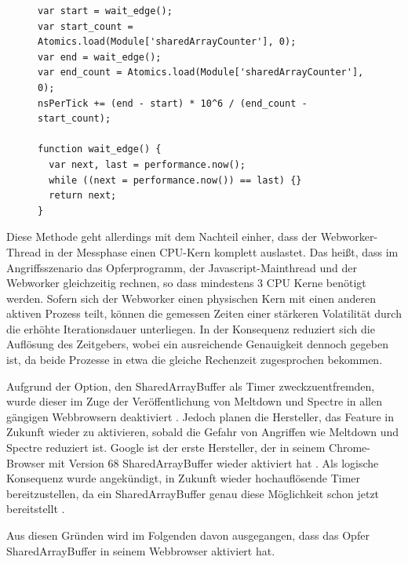 \begin{figure}[h]
\label{alg_list:getResolutionNS}
\begin{lstlisting}[caption=main.js: Code welcher die Timerauflösung bestimmt]
var start = wait_edge();
var start_count = Atomics.load(Module['sharedArrayCounter'], 0);
var end = wait_edge();
var end_count = Atomics.load(Module['sharedArrayCounter'], 0);
nsPerTick += (end - start) * 10^6 / (end_count - start_count);

function wait_edge() {
  var next, last = performance.now();
  while ((next = performance.now()) == last) {}
  return next;
}
\end{lstlisting}
\end{figure}

Diese Methode geht allerdings mit dem Nachteil einher, dass der Webworker-Thread in der Messphase einen CPU-Kern komplett auslastet. Das heißt, dass im Angriffsszenario das Opferprogramm, der Javascript-Mainthread und der Webworker gleichzeitig rechnen, so dass mindestens 3 CPU Kerne benötigt werden. 
Sofern sich der Webworker einen physischen Kern mit einen anderen aktiven Prozess teilt, können die gemessen Zeiten einer stärkeren Volatilität durch die erhöhte Iterationsdauer unterliegen.
In der Konsequenz reduziert sich die Auflösung des Zeitgebers, wobei ein ausreichende Genauigkeit dennoch gegeben ist, da beide Prozesse in etwa die gleiche Rechenzeit zugesprochen bekommen.

Aufgrund der Option, den SharedArrayBuffer als Timer zweckzuentfremden, wurde dieser im Zuge der Veröffentlichung von Meltdown und Spectre in allen gängigen Webbrowsern deaktiviert \cite{FirefoxSharedArrayBuffer}. Jedoch planen die Hersteller, das Feature in Zukunft wieder zu aktivieren, sobald die Gefahr von Angriffen wie Meltdown und Spectre reduziert ist. 
Google ist der erste Hersteller, der in seinem Chrome-Browser mit Version 68 SharedArrayBuffer wieder aktiviert hat \cite{ChromeSharedArrayBufferAgain}. 
Als logische Konsequenz wurde angekündigt, in Zukunft wieder hochauflösende Timer bereitzustellen, da ein SharedArrayBuffer genau diese Möglichkeit schon jetzt bereitstellt \cite{ChromeHighResolutionTimerAgain}.

Aus diesen Gründen wird im Folgenden davon ausgegangen, dass das Opfer SharedArrayBuffer in seinem Webbrowser aktiviert hat.


